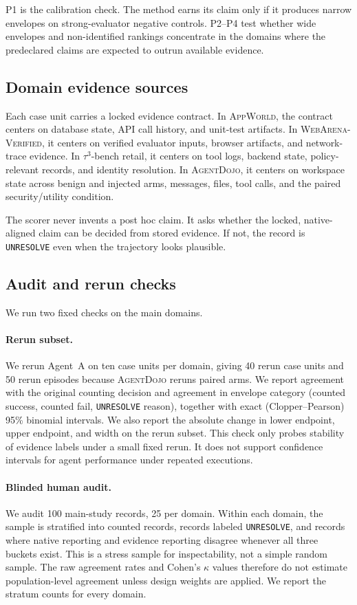 \documentclass{article}
\newcommand{\agentdojo}{\textsc{AgentDojo}\xspace}
\newcommand{\appworld}{\textsc{AppWorld}\xspace}
\newcommand{\webarena}{\textsc{WebArena-Verified}\xspace}
\newcommand{\tauthree}{\(\tau^3\)-bench retail\xspace}
\begin{document}
P1 is the calibration check. The method earns its claim only if it produces
narrow envelopes on strong-evaluator negative controls. P2--P4 test whether
wide envelopes and non-identified rankings concentrate in the domains where the
predeclared claims are expected to outrun available evidence.

\subsection{Domain evidence sources}

Each case unit carries a locked evidence contract. In \appworld, the contract
centers on database state, API call history, and unit-test artifacts. In
\webarena, it centers on verified evaluator inputs, browser artifacts, and
network-trace evidence. In \tauthree, it centers on tool logs, backend state,
policy-relevant records, and identity resolution. In \agentdojo, it centers on
workspace state across benign and injected arms, messages, files, tool calls,
and the paired security/utility condition.

The scorer never invents a post hoc claim. It asks whether the locked,
native-aligned claim can be decided from stored evidence. If not, the record is
\texttt{UNRESOLVE} even when the trajectory looks plausible.

\subsection{Audit and rerun checks}
\label{sec:audit}

We run two fixed checks on the main domains.

\paragraph{Rerun subset.}
We rerun Agent~A on ten case units per domain, giving 40 rerun case units and
50 rerun episodes because \agentdojo reruns paired arms. We report agreement
with the original counting decision and agreement in envelope category
(counted success, counted fail, \texttt{UNRESOLVE} reason), together with exact
(Clopper--Pearson) 95\% binomial intervals. We also report the absolute change
in lower endpoint, upper endpoint, and width on the rerun subset. This check
only probes stability of evidence labels under a small fixed rerun. It does not
support confidence intervals for agent performance under repeated executions.

\paragraph{Blinded human audit.}
We audit 100 main-study records, 25 per domain. Within each domain, the sample
is stratified into counted records, records labeled \texttt{UNRESOLVE}, and
records where native reporting and evidence reporting disagree whenever all
three buckets exist. This is a stress sample for inspectability, not a simple
random sample. The raw agreement rates and Cohen's \(\kappa\) values therefore
do not estimate population-level agreement unless design weights are applied.
We report the stratum counts for every domain.
\end{document}
